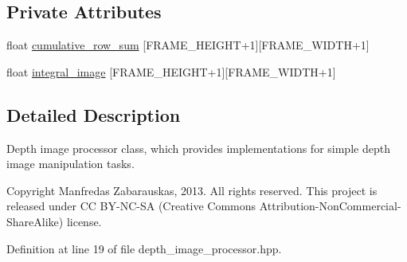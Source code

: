 \subsection*{\-Private \-Attributes}
\begin{DoxyCompactItemize}
\item 
float \hyperlink{class_r_p_depth_image_processor_ac45e82c0c039322084c0f6a632894f94}{cumulative\-\_\-row\-\_\-sum} \mbox{[}\-F\-R\-A\-M\-E\-\_\-\-H\-E\-I\-G\-H\-T+1\mbox{]}\mbox{[}\-F\-R\-A\-M\-E\-\_\-\-W\-I\-D\-T\-H+1\mbox{]}
\item 
float \hyperlink{class_r_p_depth_image_processor_a2b8401518c029b8485de8924ff49eb68}{integral\-\_\-image} \mbox{[}\-F\-R\-A\-M\-E\-\_\-\-H\-E\-I\-G\-H\-T+1\mbox{]}\mbox{[}\-F\-R\-A\-M\-E\-\_\-\-W\-I\-D\-T\-H+1\mbox{]}
\end{DoxyCompactItemize}


\subsection{\-Detailed \-Description}
\-Depth image processor class, which provides implementations for simple depth image manipulation tasks. 

\begin{DoxyCopyright}{\-Copyright}
\-Manfredas \-Zabarauskas, 2013. \-All rights reserved. \-This project is released under \-C\-C \-B\-Y-\/\-N\-C-\/\-S\-A (\-Creative \-Commons \-Attribution-\/\-Non\-Commercial-\/\-Share\-Alike) license. 
\end{DoxyCopyright}


\-Definition at line 19 of file depth\-\_\-image\-\_\-processor.\-hpp.



